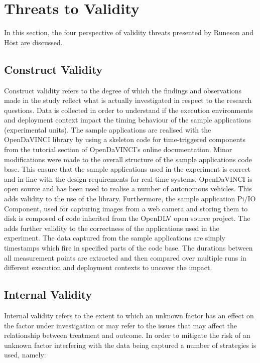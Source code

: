 \iffalse  \fi
\chapter{Threats to Validity}
In this section, the four perspective of validity threats presented by Runeson and H\"{o}st \cite{runeson} are discussed.


\section{Construct Validity}
Construct validity refers to the degree of which the findings and observations made in the study reflect what is actually investigated in respect to the research questions. Data is collected in order to understand if the execution environments and deployment context impact the timing behaviour of the sample applications (experimental units). The sample applications are realised with the OpenDaVINCI library by using a skeleton code for time-triggered components from the tutorial section of OpenDaVINCI's online documentation. Minor modifications were made to the overall structure of the sample applications code base. This ensure that the sample applications used in the experiment is correct and in-line with the design requirements for real-time systems. OpenDaVINCI is open source and has been used to realise a number of autonomous vehicles. This adds validity to the use of the library. Furthermore, the sample application Pi/IO Component, used for capturing images from a web camera and storing them to disk is composed of code inherited from the OpenDLV open source project. The adds further validity to the correctness of the applications used in the experiment. The data captured from the sample applications are simply timestamps which fire in specified parts of the code base. 
The durations between all measurement points are extracted and then compared over multiple runs in different execution and deployment contexts to uncover the impact.

\section{Internal Validity}
Internal validity refers to the extent to which an unknown factor has an effect on the factor under investigation or may refer to the issues that may affect the relationship between treatment and outcome. In order to mitigate the risk of an unknown factor interfering with the data being captured a number of strategies is used, namely: \\


